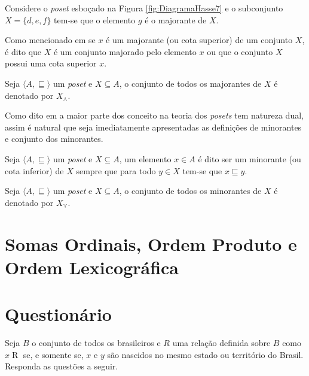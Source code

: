 \begin{example}
	Considere o \textit{poset} esboçado na Figura \ref{fig:DiagramaHasse7} e o subconjunto $X = \{d, e, f\}$ tem-se que o elemento $g$ é o majorante de $X$.
\end{example}

Como mencionado em \cite{abe1991-TC} se $x$ é um majorante (ou cota superior) de um conjunto $X$, é dito que $X$ é um conjunto majorado pelo elemento $x$ ou que o conjunto $X$ possui uma cota superior $x$.

\begin{definition}\label{def:ConjuntoDosMajorantes}
	Seja $\langle A, \sqsubseteq \rangle$ um \textit{poset} e $X \subseteq A$, o conjunto de todos os majorantes de $X$ é denotado por $X_\curlywedge$.
\end{definition}

Como dito em \cite{abe1991-TC, carmo2013, morgado1962poset} a maior parte dos conceito na teoria dos \textit{posets} tem natureza dual, assim é natural que seja imediatamente apresentadas as definições de minorantes e conjunto dos minorantes.

\begin{definition}[Majorante]\label{def:Mjnorante}
	Seja $\langle A, \sqsubseteq \rangle$ um \textit{poset} e $X \subseteq A$, um elemento $x \in A$ é dito ser um minorante (ou cota inferior) de $X$ sempre que para todo $y \in X$ tem-se que $x\sqsubseteq y$.
\end{definition}

\begin{definition}\label{def:ConjuntoDosMjnorantes}
	Seja $\langle A, \sqsubseteq \rangle$ um \textit{poset} e $X \subseteq A$, o conjunto de todos os minorantes de $X$ é denotado por $X_\curlyvee$.
\end{definition}

\section{Somas Ordinais, Ordem Produto e Ordem Lexicográfica}\label{sec:OperacoesPoset}

\section{Questionário}\label{sec:Questionario4part1}

\begin{problem}\label{prob:EquivalenciaOrdem1}
	Seja $B$ o conjunto de todos os brasileiros e $R$ uma relação definida sobre $B$ como $x \mathrel{R}$ se, e somente se, $x$ e $y$ são nascidos no mesmo estado ou território do Brasil. Responda as questões a seguir.
\end{problem}

